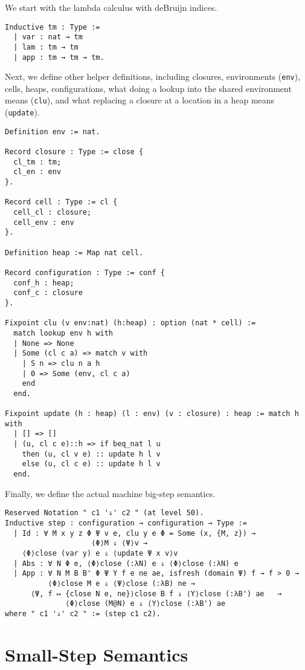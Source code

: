 We start with the lambda calculus with deBruijn indices.

\begin{verbatim}
Inductive tm : Type := 
  | var : nat → tm 
  | lam : tm → tm
  | app : tm → tm → tm.
\end{verbatim}

Next, we define other helper definitions, including closures, environments
(\texttt{env}), cells, heaps, configurations, what doing a lookup into the
shared environment means (\texttt{clu}), and what replacing a closure at a
location in a heap means (\texttt{update}).

\begin{verbatim}
Definition env := nat.

Record closure : Type := close {
  cl_tm : tm;
  cl_en : env
}.

Record cell : Type := cl {
  cell_cl : closure;
  cell_env : env
}.

Definition heap := Map nat cell.

Record configuration : Type := conf {
  conf_h : heap;
  conf_c : closure
}.

Fixpoint clu (v env:nat) (h:heap) : option (nat * cell) := 
  match lookup env h with
  | None => None
  | Some (cl c a) => match v with
    | S n => clu n a h
    | 0 => Some (env, cl c a)
    end
  end.

Fixpoint update (h : heap) (l : env) (v : closure) : heap := match h with 
  | [] => []
  | (u, cl c e)::h => if beq_nat l u 
    then (u, cl v e) :: update h l v 
    else (u, cl c e) :: update h l v
  end.
\end{verbatim}
Finally, we define the actual machine big-step semantics.
\begin{verbatim}
Reserved Notation " c1 '⇓' c2 " (at level 50).
Inductive step : configuration → configuration → Type :=
  | Id : ∀ M x y z Φ Ψ v e, clu y e Φ = Some (x, {M, z}) → 
                    ⟨Φ⟩M ⇓ ⟨Ψ⟩v →
    ⟨Φ⟩close (var y) e ⇓ ⟨update Ψ x v⟩v
  | Abs : ∀ N Φ e, ⟨Φ⟩close (:λN) e ⇓ ⟨Φ⟩close (:λN) e
  | App : ∀ N M B B' Φ Ψ Υ f e ne ae, isfresh (domain Ψ) f → f > 0 →
          ⟨Φ⟩close M e ⇓ ⟨Ψ⟩close (:λB) ne → 
      ⟨Ψ, f ↦ {close N e, ne}⟩close B f ⇓ ⟨Υ⟩close (:λB') ae   →
              ⟨Φ⟩close (M@N) e ⇓ ⟨Υ⟩close (:λB') ae
where " c1 '⇓' c2 " := (step c1 c2).
\end{verbatim}

\section{Small-Step \ce Semantics}


